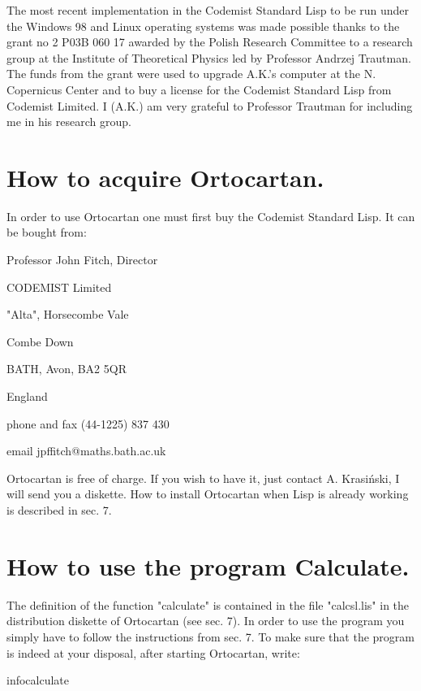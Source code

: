 The most recent implementation in the Codemist Standard Lisp to be run under
the  Windows 98 and Linux operating systems was made possible thanks to the
grant no 2 P03B 060 17 awarded by the Polish Research Committee to a research
group at the Institute of Theoretical Physics led by Professor Andrzej
Trautman. The funds from the grant were used to upgrade A.K.'s computer at the
N. Copernicus Center and to buy a license for the Codemist Standard Lisp from
Codemist Limited. I (A.K.) am very grateful to Professor Trautman for including
me in his research group.

\appendix

\section{How to acquire Ortocartan.}

In order to use Ortocartan one must first buy the Codemist Standard Lisp. It
can be bought from:

\bigskip

     Professor John Fitch, Director

     CODEMIST Limited

     "Alta", Horsecombe Vale

     Combe Down

     BATH, Avon, BA2 5QR

     England

     phone and fax (44-1225) 837 430

     email jpffitch@maths.bath.ac.uk

\bigskip

Ortocartan is free of charge. If you wish to have it, just contact A.
Krasi\'nski, I will send you a diskette. How to install Ortocartan when Lisp is
already working is described in sec. 7.

\section {How to use the program Calculate.}

The definition of the function "calculate" is contained in the file
"calcsl.lis" in the distribution diskette of Ortocartan  (see  sec.  7). In
order to use the program you
     simply have to follow the instructions from sec. 7. To  make
     sure that the program is  indeed  at  your  disposal,  after
     starting Ortocartan, write:

\bigskip

infocalculate

